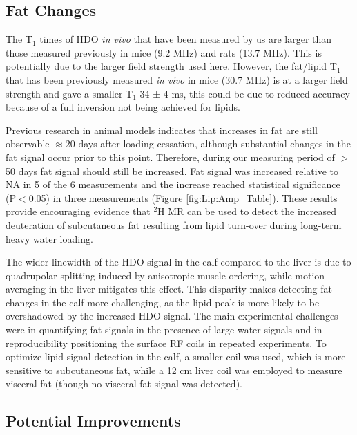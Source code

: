 \documentclass[class=article, crop=false]{standalone}
\begin{document}
\subsection{Fat Changes}

The T$_1$ times of HDO \textit{in vivo} that have been measured by us are larger than those measured previously in mice\cite{Fung1979StudyWater} (9.2 MHz) and rats\cite{Block1987COMMUNICATIONSTissues} (13.7 MHz). This is potentially due to the larger field strength used here. However, the fat/lipid T$_1$ that has been previously measured \textit{in vivo} in mice (30.7 MHz) is at a larger field strength and gave a smaller T$_1$ 34 ± 4 ms\cite{Brereton1986PreliminarySpectroscopy}, this could be due to reduced accuracy because of a full inversion not being achieved for lipids. 

Previous research in animal models indicates that increases in fat are still observable $\approx$20 days after loading cessation, although substantial changes in the fat signal occur prior to this point\cite{Brereton1986PreliminarySpectroscopy}. Therefore, during our measuring period of $>$ 50 days fat signal should still be increased. Fat signal was increased relative to NA in 5 of the 6 measurements and the increase reached statistical significance (P$<$0.05) in three measurements (Figure \ref{fig:Lip:Amp_Table}). These results provide encouraging evidence that $^2$H MR can be used to detect the increased deuteration of subcutaneous fat resulting from lipid turn-over during long-term heavy water loading. 

The wider linewidth of the HDO signal in the calf compared to the liver is due to quadrupolar splitting induced by anisotropic muscle ordering\cite{Gursan2022ResidualMuscle}, while motion averaging in the liver mitigates this effect. This disparity makes detecting fat changes in the calf more challenging, as the lipid peak is more likely to be overshadowed by the increased HDO signal. The main experimental challenges were in quantifying fat signals in the presence of large water signals and in reproducibility positioning the surface RF coils in repeated experiments. To optimize lipid signal detection in the calf, a smaller coil was used, which is more sensitive to subcutaneous fat, while a 12 cm liver coil was employed to measure visceral fat (though no visceral fat signal was detected). 

\subsection{Potential Improvements}
\end{document}
